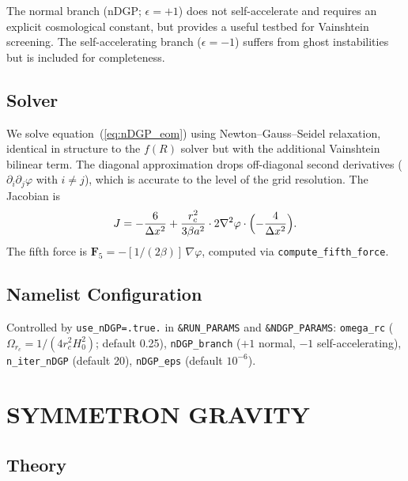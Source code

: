 \documentclass[fleqn,usenatbib]{mnras}
\newcommand{\code}[1]{\texttt{#1}}
\newcommand{\fR}{f(R)}
\begin{document}
The normal branch (nDGP; $\epsilon = +1$) does not self-accelerate and
requires an explicit cosmological constant, but provides a useful
testbed for Vainshtein screening.  The self-accelerating branch
($\epsilon = -1$) suffers from ghost instabilities but is included
for completeness.

\subsection{Solver}

We solve equation~(\ref{eq:nDGP_eom}) using Newton--Gauss--Seidel
relaxation, identical in structure to the $\fR$ solver but with the
additional Vainshtein bilinear term.  The diagonal approximation
\citep{Li2013} drops off-diagonal second derivatives
($\partial_i\partial_j\varphi$ with $i \neq j$), which is accurate to
the level of the grid resolution.  The Jacobian is
\begin{equation}
J = -\frac{6}{\Delta x^2}
  + \frac{r_c^2}{3\beta a^2}\cdot 2\nabla^2\varphi\cdot
    \Bigl(-\frac{4}{\Delta x^2}\Bigr).
\end{equation}
The fifth force is $\mathbf{F}_5 = -[1/(2\beta)]\,\nabla\varphi$,
computed via \code{compute\_fifth\_force}.

\subsection{Namelist Configuration}

Controlled by \code{use\_nDGP=.true.} in \code{\&RUN\_PARAMS} and
\code{\&NDGP\_PARAMS}:
\code{omega\_rc} ($\Omega_{r_c} = 1/(4r_c^2 H_0^2)$; default 0.25),
\code{nDGP\_branch} ($+1$ normal, $-1$ self-accelerating),
\code{n\_iter\_nDGP} (default 20),
\code{nDGP\_eps} (default $10^{-6}$).


\section{SYMMETRON GRAVITY}
\label{sec:symmetron}

\subsection{Theory}
\end{document}
